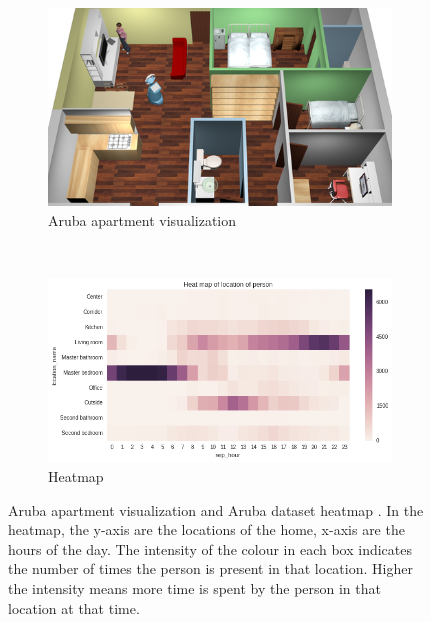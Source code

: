 \begin{figure}
    \centering
    \begin{subfigure}[b]{0.4\textwidth}

        \includegraphics[width=\textwidth]{images/aruba-flat.png}
        \caption{Aruba apartment visualization}
        \label{aruba}
    \end{subfigure}
    ~ %
    \begin{subfigure}[b]{0.5\textwidth}
        \includegraphics[width=\textwidth]{images/aruba-data.png}
        \caption{Heatmap}
        \label{fig:eval_gt}
    \end{subfigure}

    \caption[Aruba apartment visualization]{Aruba apartment visualization \citep{krajnik_wheres_2015} and Aruba dataset heatmap . In the heatmap, the y-axis are the locations of the home, x-axis are the hours of the day. The intensity of the colour in each box indicates the number of times the person is present in that location. Higher the intensity means more time is spent by the person in that location at that time.}
    \label{aruba-visual}
\end{figure}

